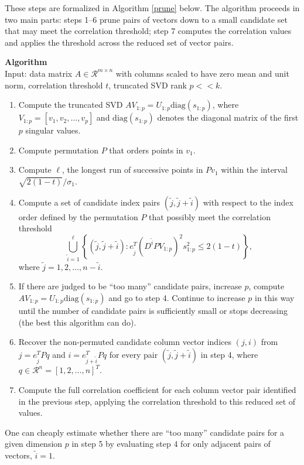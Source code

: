 \documentclass{article}
\newcounter{algorithmctr}
\newenvironment{algorithm}{
   \refstepcounter{algorithmctr}
   \bigskip\noindent
   \textbf{Algorithm \thealgorithmctr\\}
}
{\bigskip}
\numberwithin{algorithmctr}{section}
\begin{document}
These steps are formalized in Algorithm \ref{prune} below. The algorithm
proceeds in two main parts: steps 1--6 prune pairs of vectors down to a small
candidate set that may meet the correlation threshold; step 7
computes the correlation values and applies the threshold across the reduced
set of vector pairs.

\begin{algorithm}\label{prune}
Input: data matrix $A\in \mathcal{R}^{m\times n}$ with columns scaled to have
zero mean and unit norm, correlation threshold $t$,
truncated SVD rank $p<<k$.
\begin{enumerate}
\item Compute the truncated SVD
$AV_{1:p} = U_{1:p}\mathrm{diag}(s_{1:p})$,
where\\
$V_{1:p}=[v_1, v_2, \ldots, v_p]$
and $\mathrm{diag}(s_{1:p})$ denotes the diagonal matrix of the first $p$ singular values.
\item Compute permutation $P$ that orders points in $v_1$.
\item Compute $\ell$, the longest run of successive points in $P v_1$ within the interval $\sqrt{2(1-t)}/\sigma_1$.
\item Compute a set of candidate index pairs $(\tilde{j},\tilde{j}+\tilde{i})$ with respect to the index order defined by the permutation $P$ that possibly meet the correlation threshold
\[
\bigcup_{\tilde{i}=1}^\ell
\left\{
(\tilde{j},\tilde{j}+\tilde{i}) : 
e_{\tilde{j}}^T(D^{\tilde{i}} P V_{1:p} )^2 s_{1:p}^2 \le 2(1-t)
\right\},
\]
where $\tilde{j}=1,2,\ldots,n-\tilde{i}$.
\item If there are judged to be  ``too many'' candidate pairs, increase $p$,
compute $AV_{1:p} = U_{1:p}\mathrm{diag}(s_{1:p})$ and go to step 4.
Continue to increase $p$ in this way until the number of candidate
pairs is sufficiently small or stops decreasing (the best this algorithm can do).
\item Recover the non-permuted candidate column vector
indices $(j,i)$ from $j=e_{\tilde{j}}^T Pq$ and $i=e_{\tilde{j}+\tilde{i}}^TPq$ for every
pair $(\tilde{j},\tilde{j} + \tilde{i})$ in step 4, where
$q\in\mathcal{R}^n = [1,2,\ldots,n]^T$.
\item Compute the full correlation coefficient for each column vector pair identified in
the previous step, applying the correlation threshold to this reduced set of values.
\end{enumerate}
\end{algorithm}
One can cheaply estimate whether there are ``too many'' candidate pairs for a
given dimension $p$ in step 5 by evaluating step 4 for only adjacent pairs of
vectors, $\tilde{i}=1$.
\end{document}
